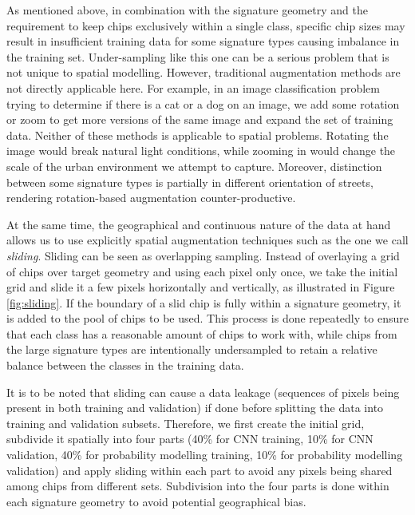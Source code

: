 

As mentioned above, in combination with the signature geometry and
the requirement to keep chips exclusively within a single class, specific chip sizes may result in
insufficient training data for some signature types causing imbalance in the training set. Under-sampling like this
one can be a serious problem that is not unique to spatial modelling. However,
traditional augmentation methods are not directly applicable here. For example, in an
image classification problem trying to determine if there is a cat or a dog on an image,
we add some rotation or zoom to get more versions of
the same image and expand the set of training data. Neither of these methods is
applicable to spatial problems. Rotating the image would break
natural light conditions, while zooming in would change the scale of the urban environment
we attempt to capture. Moreover, distinction between some signature types is partially
in different orientation of streets, rendering rotation-based augmentation counter-productive.

At the same time, the geographical and continuous nature of the data at hand
allows us to use explicitly spatial augmentation techniques such as the one we
call \textit{sliding}.
Sliding can be seen as overlapping sampling. Instead of overlaying a grid of chips over
target geometry and using each pixel only once, we take the initial grid and slide it a
few pixels horizontally and vertically, as illustrated in Figure \ref{fig:sliding}. If
the boundary of a slid chip is fully within a signature geometry, it is added to the
pool of chips to be used. This process is done repeatedly to ensure that each class has
a reasonable amount of chips to work with, while chips from the large signature types
are intentionally undersampled to retain a relative balance between the classes in the training data.

It is to be noted that sliding can cause a data leakage (sequences of pixels being
present in both training and validation) if done before splitting the data into
training and validation subsets. Therefore, we first create the initial grid, subdivide
it spatially into four parts (40\% for CNN training, 10\% for CNN validation, 40\% for
probability modelling training, 10\% for probability modelling validation) and apply
sliding within each part to avoid any pixels being shared among chips from different
sets. Subdivision into the four parts is done within each signature geometry to avoid
potential geographical bias.

